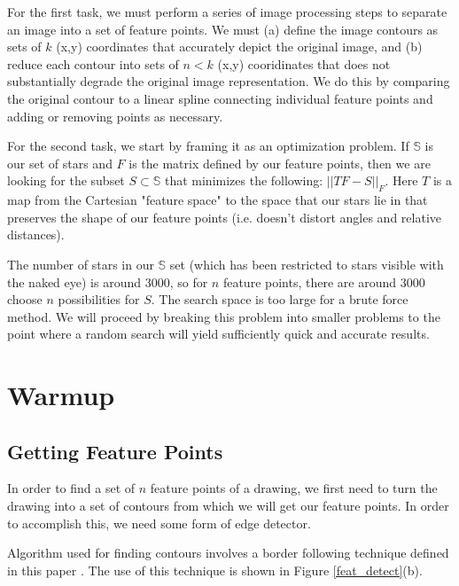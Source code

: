 \documentclass[paper=a4, fontsize=11pt]{scrartcl} %
\begin{document}
For the first task, we must perform a series of image processing steps to separate an image into a set of feature points. We must (a) define the image contours as sets of $k$ (x,y) coordinates that accurately depict the original image, and (b) reduce each contour into sets of $n<k$ (x,y) cooridinates that does not substantially degrade the original image representation. We do this by comparing the original contour to a linear spline connecting individual feature points and adding or removing points as necessary. 

For the second task, we start by framing it as an optimization problem. If $\mathbb{S}$ is our set of stars and $F$ is the matrix defined by our feature points, then we are looking for the subset $S\subset\mathbb{S}$ that minimizes the following: $||TF - S||_F$.  Here $T$ is a map from the Cartesian "feature space" to the space that our stars lie in that preserves the shape of our feature points (i.e. doesn't distort angles and relative distances).

The number of stars in our $\mathbb{S}$ set (which has been restricted to stars visible with the naked eye) is around 3000, so for $n$ feature points, there are around 3000 choose $n$ possibilities for $S$. The search space is too large for a brute force method.  We will proceed by breaking this problem into smaller problems to the point where a random search will yield sufficiently quick and accurate results.
\section{Warmup}

\subsection{Getting Feature Points}

In order to find a set of $n$ feature points of a drawing, we first need to turn the drawing into a set of contours from which we will get our feature points. In order to accomplish this, we need some form of edge detector. 

Algorithm used for finding contours involves a border following technique defined in this paper \cite{Suzuki1985}. The use of this technique is shown in Figure \ref{feat_detect}(b). 

\end{document}
